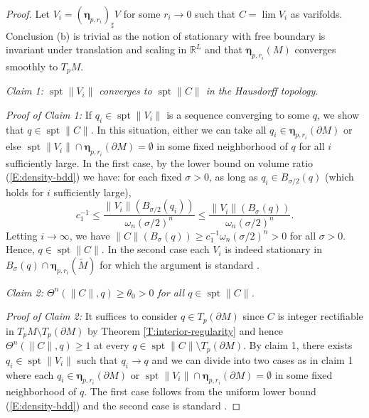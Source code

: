\documentclass[10pt]{amsart}
\theoremstyle{definition}
\theoremstyle{remark}
\numberwithin{equation}{section}
\newcommand{\si}{\sigma}
\newcommand{\bleta}{\boldsymbol \eta}
\newcommand{\tM}{\widetilde{M}}
\newcommand{\spt}{\operatorname{spt}}
\begin{document}
\begin{proof}
Let $V_i=(\bleta_{p,r_i})_\sharp V$ for some $r_i \to 0$ such that $C=\lim V_i$ as varifolds. Conclusion (b) is trivial as the notion of stationary with free boundary is invariant under translation and scaling in $\mathbb{R}^L$ and that $\bleta_{p,r_i}(M)$ converges smoothly to $T_pM$. 

\vspace{0.3cm}

\textit{Claim 1: $\spt \|V_i\|$ converges to $\spt \|C\|$ in the Hausdorff topology.}

\vspace{0.3cm}

\textit{Proof of Claim 1:} %
If $q_i \in \spt \|V_i\|$ is a sequence converging to some $q$, we show that $q \in \spt \|C\|$. In this situation, either we can take all $q_i \in \bleta_{p,r_i}(\partial M)$ or else $\spt \|V_i\| \cap \bleta_{p,r_i}(\partial M) =\emptyset$ in some fixed neighborhood of $q$ for all $i$ sufficiently large. In the first case, by the lower bound on volume ratio (\ref{E:density-bdd}) we have: for each fixed $\si>0$, as long as $q_i \in B_{\si/2}(q)$ (which holds for $i$ sufficiently large),
\[ c_1^{-1} \leq \frac{\|V_i\|(B_{\si/2}(q_i))}{\omega_n (\si/2)^n} \leq \frac{\|V_i\|(B_\si(q))}{\omega_n (\si/2)^n}.\]
Letting $i \to \infty$, we have $\|C\|(B_\si(q)) \geq c_1^{-1} \omega_n (\si/2)^n >0$ for all $\si>0$. Hence, $q \in \spt \|C\|$. In the second case each $V_i$ is indeed stationary in $B_\sigma(q) \cap \bleta_{p,r_i}(\tM)$ for which the argument is standard \cite[(5.8)]{Schoen-Simon81}. 

\vspace{0.3cm}

\textit{Claim 2: $\Theta^n(\|C\|,q) \geq \theta_0>0$ for all $q \in \spt \|C\|$.}

\vspace{0.3cm}

\textit{Proof of Claim 2:} It suffices to consider $q \in T_p(\partial M)$ since $C$ is integer rectifiable in $T_pM \setminus T_p(\partial M)$ by Theorem \ref{T:interior-regularity} and hence $\Theta^n(\|C\|,q) \geq 1$ at every $q \in \spt \|C\| \setminus T_p(\partial M)$. By claim 1, there exists $q_i \in \spt \|V_i\|$ such that $q_i \to q$ and we can divide into two cases as in claim 1 where each $q_i \in \bleta_{p,r_i}(\partial M)$ or $\spt \|V_i\| \cap \bleta_{p,r_i}(\partial M) =\emptyset$ in some fixed neighborhood of $q$. The first case follows from the uniform lower bound (\ref{E:density-bdd}) and the second case is standard \cite[Theorem 40.6]{Simon}.


\end{proof}
\end{document}
